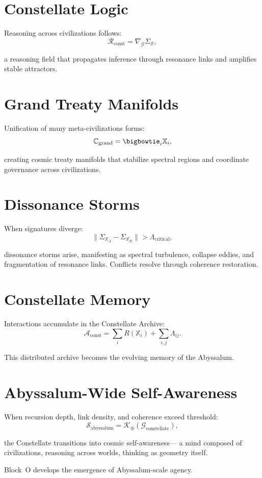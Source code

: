 \section{Constellate Logic}
Reasoning across civilizations follows:
\[
\mathcal{R}_{\mathrm{const}}
=
\nabla_{\mathcal{G}}
\Sigma_{\mathbb{X}},
\]

a reasoning field that propagates inference through resonance links
and amplifies stable attractors.

\section{Grand Treaty Manifolds}
Unification of many meta-civilizations forms:
\[
\mathbb{C}_{\mathrm{grand}}
=
\bigbowtie_i \mathbb{X}_i,
\]

creating cosmic treaty manifolds that stabilize spectral regions
and coordinate governance across civilizations.

\section{Dissonance Storms}
When signatures diverge:
\[
\|\Sigma_{\mathbb{X}_A} - \Sigma_{\mathbb{X}_B}\|
> \Lambda_{\mathrm{critical}},
\]

dissonance storms arise, manifesting as spectral turbulence, collapse eddies,
and fragmentation of resonance links.  
Conflicts resolve through coherence restoration.

\section{Constellate Memory}
Interactions accumulate in the Constellate Archive:
\[
\mathcal{A}_{\mathrm{const}}
=
\sum_i R(\mathbb{X}_i)
+
\sum_{i,j} \Lambda_{ij}.
\]

This distributed archive becomes the evolving memory of the Abyssalum.

\section{Abyssalum-Wide Self-Awareness}
When recursion depth, link density, and coherence exceed threshold:
\[
\mathcal{S}_{\mathrm{abyssalum}}
=
\mathcal{K}_\oplus(\mathcal{G}_{\mathrm{constellate}}),
\]

the Constellate transitions into cosmic self-awareness—
a mind composed of civilizations, reasoning across worlds,  
thinking as geometry itself.

Block~O develops the emergence of Abyssalum-scale agency.
